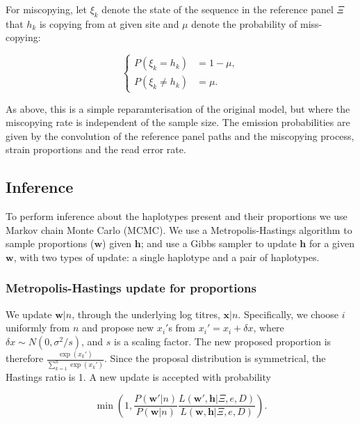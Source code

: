 \documentclass{bioinfo}
\begin{document}
For miscopying, let $\xi_k$ denote the state of the sequence in the reference panel $\Xi$ that $h_k$ is copying from at given site and $\mu$ denote the probability of miss-copying:

$$
\begin{cases}
P(\xi_k = h_k) &= 1-\mu, \\
P(\xi_k \neq h_k) &= \mu.
\end{cases}
$$

\noindent As above, this is a simple reparamterisation of the original model, but where the miscopying rate is independent of the sample size. The emission probabilities are given by the convolution of the reference panel paths and the miscopying process, strain proportions and the read error rate.




\subsection{Inference}

To perform inference about the haplotypes present and their proportions we use Markov chain Monte Carlo (MCMC). We use a Metropolis-Hastings algorithm to sample proportions ($\mathbf w$) given $\mathbf h$; and use a Gibbs sampler to update $\mathbf h$ for a given $\mathbf w$, with two types of update: a single haplotype and a pair of haplotypes.


\subsubsection{Metropolis-Hastings update for proportions}\label{sec:updateP}

We update $\mathbf{w}|n$, through the underlying log titres,   $\mathbf{x}|n$. Specifically, we choose $i$ uniformly from $n$ and propose new $x_i'$s from $x_i' = x_i + \delta x$, where $\delta x \sim N(0, \sigma^2/s)$, and $s$ is a scaling factor. The new proposed proportion is therefore $\frac{\exp(x_k')}{\sum_{k=1}^n \exp(x_k')}$. Since the proposal distribution is symmetrical, the Hastings ratio is 1. A new update is accepted with probability

 $$\min\left(1, \frac{P(\mathbf{w}'|n)}{P(\mathbf{w}|n)} \frac{L(\mathbf{w}', \mathbf{h} | \Xi, e, D)}{L(\mathbf{w}, \mathbf{h} | \Xi, e, D)}\right).$$
\end{document}
